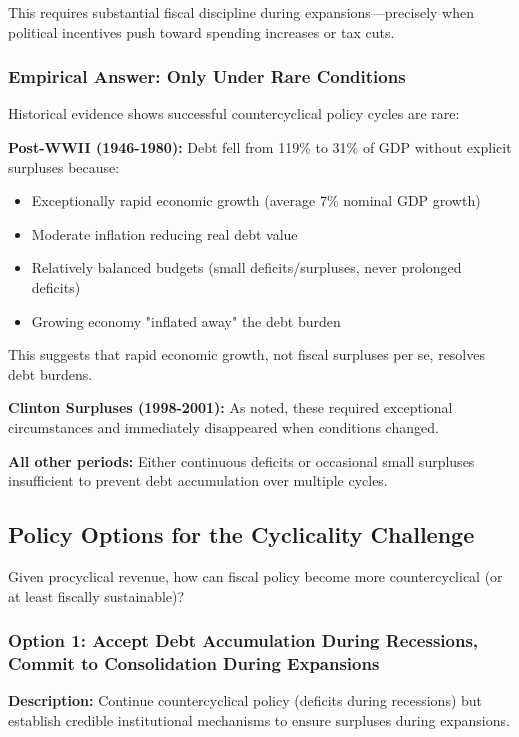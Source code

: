 \documentclass[12pt,letterpaper]{article}
\begin{document}
This requires substantial fiscal discipline during expansions—precisely when political incentives push toward spending increases or tax cuts.

\subsubsection{Empirical Answer: Only Under Rare Conditions}

Historical evidence shows successful countercyclical policy cycles are rare:

\textbf{Post-WWII (1946-1980):} Debt fell from 119\% to 31\% of GDP without explicit surpluses because:
\begin{itemize}
    \item Exceptionally rapid economic growth (average 7\% nominal GDP growth)
    \item Moderate inflation reducing real debt value
    \item Relatively balanced budgets (small deficits/surpluses, never prolonged
deficits)
    \item Growing economy "inflated away" the debt burden
\end{itemize}

This suggests that rapid economic growth, not fiscal surpluses per se, resolves debt burdens.

\textbf{Clinton Surpluses (1998-2001):} As noted, these required exceptional circumstances and immediately disappeared when conditions changed.

\textbf{All other periods:} Either continuous deficits or occasional small surpluses insufficient to prevent debt accumulation over multiple cycles.

\subsection{Policy Options for the Cyclicality Challenge}

Given procyclical revenue, how can fiscal policy become more countercyclical (or at least fiscally sustainable)?

\subsubsection{Option 1: Accept Debt Accumulation During Recessions, Commit to Consolidation During Expansions}

\textbf{Description:} Continue countercyclical policy (deficits during recessions) but establish credible institutional mechanisms to ensure surpluses during expansions.
\end{document}
